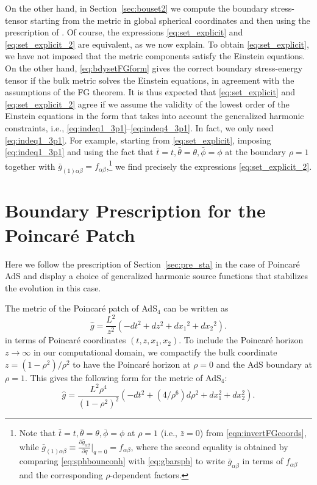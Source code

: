 \documentclass[aps,letterpaper,twocolumn,nofootinbib]{revtex4}
\numberwithin{equation}{section}
\begin{document}
On the other hand, in Section~\ref{sec:bouset2} we compute the boundary stress-tensor starting from the metric in global spherical coordinates and then using the prescription of \cite{Balasubramanian:1999re}. Of course, the expressions \eqref{eq:set_explicit} and \eqref{eq:set_explicit_2} are equivalent, as we now explain. To obtain \eqref{eq:set_explicit}, we have not imposed that the metric components satisfy the Einstein equations. On the other hand, \eqref{eq:bdysetFGform} gives the correct boundary stress-energy tensor if the bulk metric solves the Einstein equations, in agreement with the assumptions of the FG theorem. It is thus expected that \eqref{eq:set_explicit} and \eqref{eq:set_explicit_2} agree if we assume the validity of the lowest order of the Einstein equations in the form that takes into account the generalized harmonic constraints, i.e., \eqref{eq:indeq1_3p1}--\eqref{eq:indeq4_3p1}.
In fact, we only need \eqref{eq:indeq1_3p1}. For example, starting from \eqref{eq:set_explicit}, imposing \eqref{eq:indeq1_3p1} and using the fact that $\bar{t}=t,\bar{\theta}=\theta,\bar{\phi}=\phi$ at the boundary $\rho=1$ together with $\bar{g}_{(1)\alpha\beta}=f_{\alpha\beta}$,\footnote{Note that $\bar{t}=t,\bar{\theta}=\theta,\bar{\phi}=\phi$ at $\rho=1$ (i.e., $\bar{z}=0$) from \eqref{eqn:invertFGcoords}, while $\bar{g}_{(1)\alpha\beta}\equiv\frac{\partial \bar{g}_{\alpha\beta}}{\partial q}\bigr|_{q=0}=f_{\alpha\beta}$, where the second equality is obtained by comparing \eqref{eq:sphbounconh} with \eqref{eq:gbarsph} to write $\bar{g}_{\alpha\beta}$ in terms of $f_{\alpha\beta}$ and the corresponding $\rho$-dependent factors.} we find precisely the expressions \eqref{eq:set_explicit_2}.


\section{Boundary Prescription for the Poincar\'e Patch}\label{sec:poincare}

Here we follow the prescription of Section~\ref{sec:pre_sta} in the case of Poincar\'e AdS and display a choice of generalized harmonic source functions that stabilizes the evolution in this case.

The metric of the Poincar\'e patch of AdS$_4$ can be written as
\begin{equation}
\label{eq:AdSpoincare}
\hat{g} = \frac{L^2}{z^2} \left( -dt^2 + dz^2 + dx_1{}^2 + dx_2{}^2  \right).
\end{equation}
in terms of Poincar\'e coordinates $(t,z,x_1,x_2)$. To include the Poincar\'e horizon $z\rightarrow \infty$ in our computational domain, we compactify the bulk coordinate $z=(1-\rho^2)/\rho^2$ to have the Poincar\'e horizon at $\rho=0$ and the AdS boundary at $\rho=1$. This gives the following form for the metric of AdS$_4$:
\begin{equation}
\hat{g} = \frac{L^2 \rho^4}{(1-\rho^2)^2} \left( -dt^2 + (4/\rho^6)d\rho^2 + dx_1^2 + dx_2^2  \right).
\end{equation}
\end{document}

